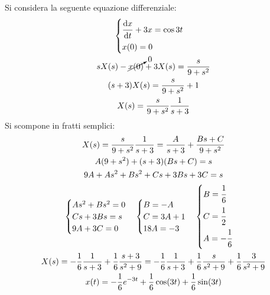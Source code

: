 \documentclass{article}
\newcommand{\df}{\mathrm{d}}
\numberwithin{equation}{subsection}
\begin{document}
Si considera la seguente equazione differenziale:
\begin{gather*}
    \begin{cases}
        \displaystyle\frac{\strut\df x}{\strut\df t}+3x=\cos3t\\
        x(0)=0
    \end{cases}\\
    sX(s)-\cancelto{0}{x(0)}+3X(s)=\frac{s}{9+s^2}\\
    (s+3)X(s)=\frac{s}{9+s^2}+1\\
    X(s)=\frac{s}{9+s^2}\frac{1}{s+3}
\end{gather*}
Si scompone in fratti semplici:
\begin{gather*}
    X(s)=\frac{s}{9+s^2}\frac{1}{s+3}=\frac{A}{s+3}+\frac{Bs+C}{9+s^2}\\
    A(9+s^2)+(s+3)(Bs+C)=s\\
    9A+As^2+Bs^2+Cs+3Bs+3C=s\\
    \begin{cases}
        As^2+Bs^2=0\\
        Cs+3Bs=s\\
        9A+3C=0
    \end{cases}\begin{cases}
        B=-A\\
        C=3A+1\\
        18A=-3
    \end{cases}\begin{cases}
        B=\displaystyle\frac{\strut1}{\strut6}\\
        C=\displaystyle\frac{\strut1}{\strut2}\\
        A=\displaystyle-\frac{\strut1}{\strut6}
    \end{cases}\\
    X(s)=-\frac{1}{6}\frac{1}{s+3}+\frac{1}{6}\frac{s+3}{s^2+9}=-\frac{1}{6}\frac{1}{s+3}+\frac{1}{6}\frac{s}{s^2+9}+\frac{1}{6}\frac{3}{s^2+9}\\
    x(t)=-\frac{1}{6}e^{-3t}+\frac{1}{6}\cos(3t)+\frac{1}{6}\sin(3t)
\end{gather*}
\end{document}

